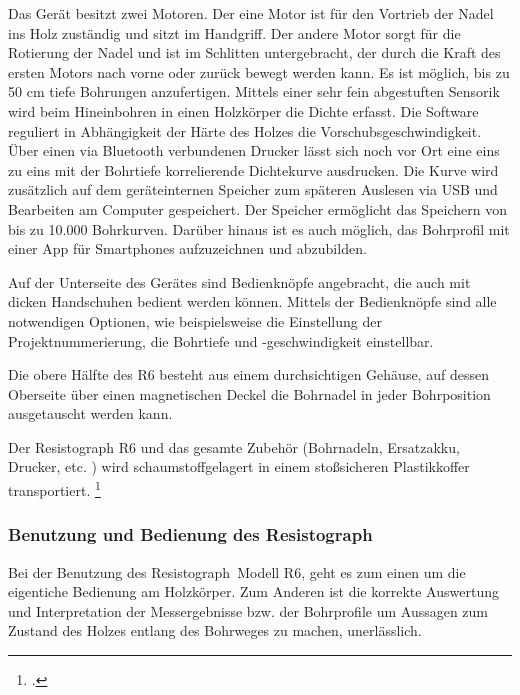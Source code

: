\documentclass[a4paper, halfparskip]{article}
\def\SymbReg{\textsuperscript{\textregistered}}
\begin{document}
Das Gerät besitzt zwei Motoren. Der eine Motor ist für den Vortrieb der Nadel
ins Holz zuständig und sitzt im Handgriff. Der andere Motor sorgt für die
Rotierung der Nadel und ist im Schlitten untergebracht, der durch die Kraft
des ersten Motors nach vorne oder zurück bewegt werden kann. Es ist möglich,
bis zu 50 cm tiefe Bohrungen anzufertigen. Mittels einer sehr fein abgestuften
Sensorik wird beim Hineinbohren in einen Holzkörper die Dichte erfasst. Die
Software reguliert in Abhängigkeit der Härte des Holzes die
Vorschubsgeschwindigkeit. Über einen via Bluetooth verbundenen Drucker lässt
sich noch vor Ort eine eins zu eins mit der Bohrtiefe korrelierende
Dichtekurve ausdrucken. Die Kurve wird zusätzlich auf dem geräteinternen
Speicher zum späteren Auslesen via USB und Bearbeiten am Computer gespeichert.
Der Speicher ermöglicht das Speichern von bis zu 10.000 Bohrkurven. Darüber
hinaus ist es auch möglich, das Bohrprofil mit einer App für Smartphones
aufzuzeichnen und abzubilden.

Auf der Unterseite des Gerätes sind Bedienknöpfe angebracht, die auch mit
dicken Handschuhen bedient werden können. Mittels der Bedienknöpfe sind alle
notwendigen Optionen, wie beispielsweise die Einstellung der
Projektnummerierung, die Bohrtiefe und -geschwindigkeit einstellbar.

Die obere Hälfte des R6 besteht aus einem durchsichtigen Gehäuse, auf dessen
Oberseite über einen magnetischen Deckel die Bohrnadel in jeder
Bohrposition ausgetauscht werden kann.

Der Resistograph R6 und das gesamte Zubehör (Bohrnadeln, Ersatzakku, Drucker,
etc. ) wird schaumstoffgelagert in einem stoßsicheren Plastikkoffer
transportiert. \footcite{rinn:anleitung_resi}

\subsubsection{Benutzung und Bedienung des Resistograph\SymbReg}
Bei der Benutzung des Resistograph\SymbReg\ Modell R6, geht es zum einen um
die eigentiche Bedienung am Holzkörper. Zum Anderen ist die korrekte 
Auswertung und Interpretation der Messergebnisse bzw. der Bohrprofile um
Aussagen zum Zustand des Holzes entlang des Bohrweges zu machen, unerlässlich.
\end{document}
